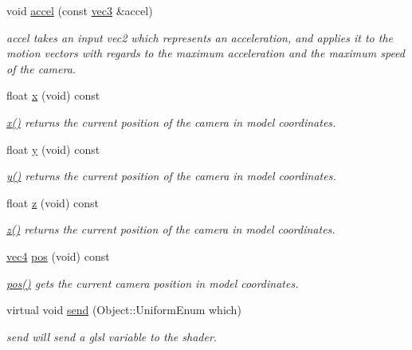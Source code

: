 \begin{DoxyCompactItemize}
void \hyperlink{class_camera_abee6a36602b8044478739cea9221ed41}{accel} (const \hyperlink{struct_angel_1_1vec3}{vec3} \&accel)
\begin{DoxyCompactList}\small\item\em accel takes an input vec2 which represents an acceleration, and applies it to the motion vectors with regards to the maximum acceleration and the maximum speed of the camera. \end{DoxyCompactList}\item 
float \hyperlink{class_camera_ab84abdd525581fbaf0462595d0a087d6}{x} (void) const 
\begin{DoxyCompactList}\small\item\em \hyperlink{class_camera_ab84abdd525581fbaf0462595d0a087d6}{x()} returns the current position of the camera in model coordinates. \end{DoxyCompactList}\item 
float \hyperlink{class_camera_a68d0865ed19510ee41c6477511d70185}{y} (void) const 
\begin{DoxyCompactList}\small\item\em \hyperlink{class_camera_a68d0865ed19510ee41c6477511d70185}{y()} returns the current position of the camera in model coordinates. \end{DoxyCompactList}\item 
float \hyperlink{class_camera_ab1167495c547046c57b1c417e53c39f6}{z} (void) const 
\begin{DoxyCompactList}\small\item\em \hyperlink{class_camera_ab1167495c547046c57b1c417e53c39f6}{z()} returns the current position of the camera in model coordinates. \end{DoxyCompactList}\item 
\hyperlink{struct_angel_1_1vec4}{vec4} \hyperlink{class_camera_a9982ac5f48fe0af97fefa725080d6da6}{pos} (void) const 
\begin{DoxyCompactList}\small\item\em \hyperlink{class_camera_a9982ac5f48fe0af97fefa725080d6da6}{pos()} gets the current camera position in model coordinates. \end{DoxyCompactList}\item 
virtual void \hyperlink{class_camera_a401decef27b59d6485b4ab9762f5b9e6}{send} (Object\-::\-Uniform\-Enum which)
\begin{DoxyCompactList}\small\item\em send will send a glsl variable to the shader. \end{DoxyCompactList}\item 

\end{DoxyCompactItemize}
